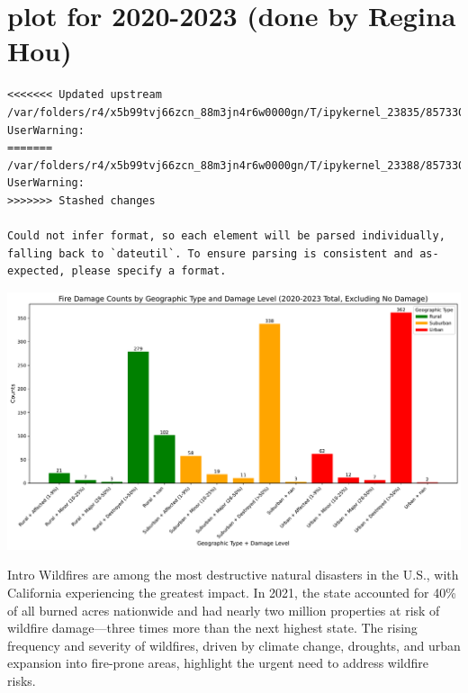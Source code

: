 \documentclass[
  letterpaper,
  DIV=11,
  numbers=noendperiod]{scrartcl}
\begin{document}
\section{plot for 2020-2023 (done by Regina
Hou)}\label{plot-for-2020-2023-done-by-regina-hou}

\begin{verbatim}
<<<<<<< Updated upstream
/var/folders/r4/x5b99tvj66zcn_88m3jn4r6w0000gn/T/ipykernel_23835/857330891.py:1: UserWarning:
=======
/var/folders/r4/x5b99tvj66zcn_88m3jn4r6w0000gn/T/ipykernel_23388/857330891.py:1: UserWarning:
>>>>>>> Stashed changes

Could not infer format, so each element will be parsed individually, falling back to `dateutil`. To ensure parsing is consistent and as-expected, please specify a format.
\end{verbatim}

\includegraphics{Final Writeup_files/figure-pdf/cell-19-output-1.pdf}

Intro Wildfires are among the most destructive natural disasters in the
U.S., with California experiencing the greatest impact. In 2021, the
state accounted for 40\% of all burned acres nationwide and had nearly
two million properties at risk of wildfire damage---three times more
than the next highest state. The rising frequency and severity of
wildfires, driven by climate change, droughts, and urban expansion into
fire-prone areas, highlight the urgent need to address wildfire risks.
\end{document}
